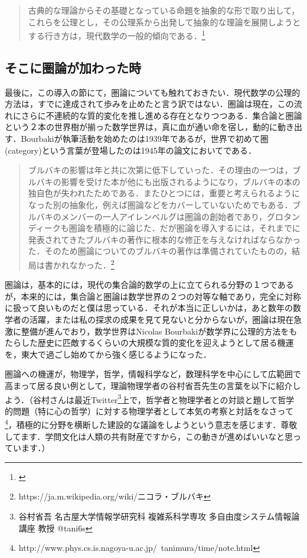 \documentclass[uplatex, 12pt, a4paper, dvipdfmx]{jsreport}
\begin{document}
\begin{quote}
	古典的な理論からその基礎となっている命題を抽象的な形で取り出して，これらを公理とし，その公理系から出発して抽象的な理論を展開しようとする行き方は，現代数学の一般的傾向である．\footnote{\cite{吉田洋一}}
\end{quote}

\subsection{そこに圏論が加わった時}

最後に，この導入の節にて，圏論についても触れておきたい．現代数学の公理的方法は，すでに達成されて歩みを止めたと言う訳ではない．圏論は現在，この流れにさらに不連続的な質的変化を推し進める存在となりつつある．集合論と圏論という２本の世界樹が揃った数学世界は，真に血が通い命を宿し，動的に動き出す．Bourbakiが執筆活動を始めたのは1939年であるが，世界で初めて圏(category)という言葉が登場したのは1945年の論文においてである．

\begin{quote}
	ブルバキの影響は年と共に次第に低下していった．その理由の一つは，ブルバキの影響を受けた本が他にも出版されるようになり，ブルバキの本の独自色が失われたためである．またひとつには，重要と考えられるようになった別の抽象化，例えば圏論などをカバーしていないためでもある．ブルバキのメンバーの一人アイレンベルグは圏論の創始者であり，グロタンディークも圏論を積極的に論じた．だが圏論を導入するには，それまでに発表されてきたブルバキの著作に根本的な修正を与えなければならなかった．そのため圏論についてのブルバキの著作は準備されていたものの，結局は書かれなかった．\footnote{https://ja.m.wikipedia.org/wiki/ニコラ・ブルバキ}
\end{quote}

圏論は，基本的には，現代の集合論的数学の上に立てられる分野の１つであるが，本来的には，集合論と圏論は数学世界の２つの対等な軸であり，完全に対称に扱って良いものだと僕は思っている．それが本当に正しいかは，あと数年の数学者の活躍，または私の探求の成果を見て見ないと分からないが，圏論は現在急激に整備が進んでおり，数学世界はNicolas Bourbakiが数学界に公理的方法をもたらした歴史に匹敵するくらいの大規模な質的変化を迎えようとして居る機運を，東大で過ごし始めてから強く感じるようになった．\par
圏論への機運が，物理学，哲学，情報科学など，数理科学を中心にして広範囲で高まって居る良い例として，理論物理学者の谷村省吾先生の言葉を以下に紹介しよう．（谷村さんは最近Twitter\footnote{谷村省吾 名古屋大学情報学研究科 複雑系科学専攻 多自由度システム情報論講座 教授 @tani6s}上で，哲学者と物理学者との対談と題して哲学的問題（特に心の哲学）に対する物理学者として本気の考察と対話をなさって\footnote{http://www.phys.cs.is.nagoya-u.ac.jp/~tanimura/time/note.html}，積極的に分野を横断した建設的な議論をしようという意志を感じます．尊敬してます．学問文化は人類の共有財産ですから，この動きが進めばいいなと思っています．）
\end{document}
